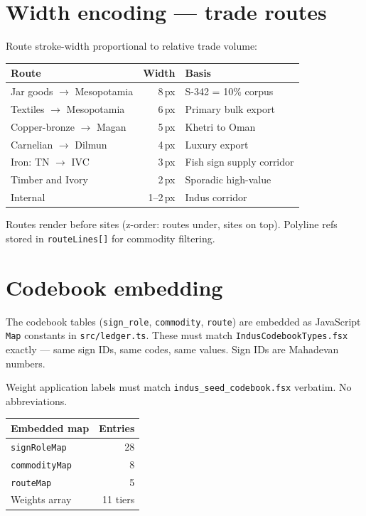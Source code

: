 \documentclass[11pt]{article}
\begin{document}
\section{Width encoding --- trade routes}

Route stroke-width proportional to relative trade volume:

\begin{center}\small
\begin{tabular}{@{}lrl@{}}
\toprule
\textbf{Route} & \textbf{Width} & \textbf{Basis} \\
\midrule
Jar goods $\to$ Mesopotamia & 8\,px & S-342 = 10\% corpus \\
Textiles $\to$ Mesopotamia & 6\,px & Primary bulk export \\
Copper-bronze $\to$ Magan & 5\,px & Khetri to Oman \\
Carnelian $\to$ Dilmun & 4\,px & Luxury export \\
Iron: TN $\to$ IVC & 3\,px & Fish sign supply corridor \\
Timber and Ivory & 2\,px & Sporadic high-value \\
Internal & 1--2\,px & Indus corridor \\
\bottomrule
\end{tabular}
\end{center}

Routes render before sites (z-order: routes under, sites on top).
Polyline refs stored in \texttt{routeLines[]} for commodity
filtering.

\section{Codebook embedding}

The codebook tables (\texttt{sign\_role}, \texttt{commodity},
\texttt{route}) are embedded as JavaScript \texttt{Map}
constants in \texttt{src/ledger.ts}. These must match
\texttt{IndusCodebookTypes.fsx} exactly --- same sign IDs,
same codes, same values. Sign IDs are Mahadevan numbers.

Weight application labels must match
\texttt{indus\_seed\_codebook.fsx} verbatim. No abbreviations.

\begin{center}\small
\begin{tabular}{@{}lr@{}}
\toprule
\textbf{Embedded map} & \textbf{Entries} \\
\midrule
\texttt{signRoleMap} & 28 \\
\texttt{commodityMap} & 8 \\
\texttt{routeMap} & 5 \\
Weights array & 11 tiers \\
\bottomrule
\end{tabular}
\end{center}
\end{document}
